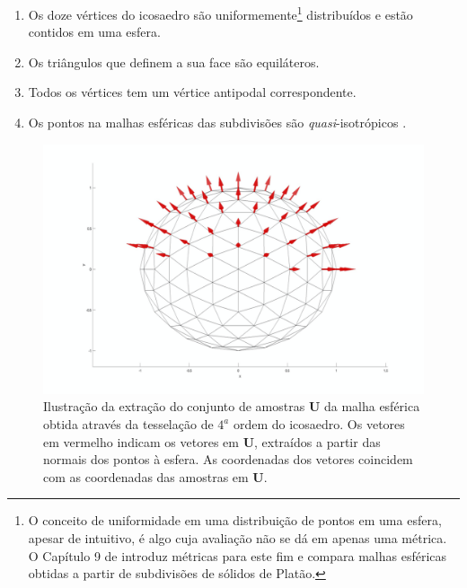 \documentclass[
    12pt,                %
    oneside,            %
    a4paper,            %
    english,            %
    french,                %
    spanish,            %
    brazil                %
    ]{abntex2}
\begin{document}
\begin{enumerate}
    \item Os doze vértices do icosaedro são uniformemente\footnote{O conceito de uniformidade em uma distribuição de pontos em uma esfera, apesar de intuitivo, é algo cuja avaliação não se dá em apenas uma métrica. O Capítulo 9 de \cite{popko2012} introduz métricas para este fim e compara malhas esféricas obtidas a partir de subdivisões de sólidos de Platão.} distribuídos e estão contidos em uma esfera.
    \item Os triângulos que definem a sua face são equiláteros.
    \item Todos os vértices tem um vértice antipodal correspondente.
    \item Os pontos na malhas esféricas das subdivisões são \textit{quasi}-isotrópicos \cite{popko2012}.
\end{enumerate}



 \begin{figure}[ht]
     \centering
     \includegraphics[width=.8\linewidth, angle=0]{figs/HARDI/icosphere_normals.png}
     \caption{
     Ilustração da extração do conjunto de amostras $\mathbf{U}$ da malha esférica obtida através da tesselação de $4^a$ ordem do icosaedro. Os vetores em vermelho indicam os vetores em $\mathbf{U}$, extraídos a partir das normais dos pontos à esfera. As coordenadas dos vetores coincidem com as coordenadas das amostras em $\mathbf{U}$.%
     }
     \label{fig::direcoes}
   \hspace{1pt}
 \end{figure}
\end{document}
